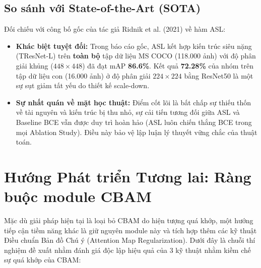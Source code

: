 \documentclass{article}
\begin{document}
\subsection{So sánh với State-of-the-Art (SOTA)}
Đối chiếu với công bố gốc của tác giả Ridnik et al. (2021) về hàm ASL:
\begin{itemize}
    \item \textbf{Khác biệt tuyệt đối:} Trong báo cáo gốc, ASL kết hợp kiến trúc siêu nặng (TResNet-L) trên \textbf{toàn bộ} tập dữ liệu MS COCO (118.000 ảnh) với độ phân giải khủng ($448 \times 448$) đã đạt mAP \textbf{86.6\%}. Kết quả \textbf{72.28\%} của nhóm trên tập dữ liệu con (16.000 ảnh) ở độ phân giải $224 \times 224$ bằng ResNet50 là một sự sụt giảm tất yếu do thiết kế scale-down.
    \item \textbf{Sự nhất quán về mặt học thuật:} Điểm cốt lõi là bất chấp sự thiếu thốn về tài nguyên và kiến trúc bị thu nhỏ, sự cải tiến tương đối giữa ASL và Baseline BCE vẫn được duy trì hoàn hảo (ASL luôn chiến thắng BCE trong mọi Ablation Study). Điều này bảo vệ lập luận lý thuyết vững chắc của thuật toán.
\end{itemize}

\section{Hướng Phát triển Tương lai: Ràng buộc module CBAM}

Mặc dù giải pháp hiện tại là loại bỏ CBAM do hiện tượng quá khớp, một hướng tiếp cận tiềm năng khác là giữ nguyên module này và tích hợp thêm các kỹ thuật Điều chuẩn Bản đồ Chú ý (Attention Map Regularization). Dưới đây là chuỗi thí nghiệm đề xuất nhằm đánh giá độc lập hiệu quả của 3 kỹ thuật nhằm kiềm chế sự quá khớp của CBAM:
\end{document}
